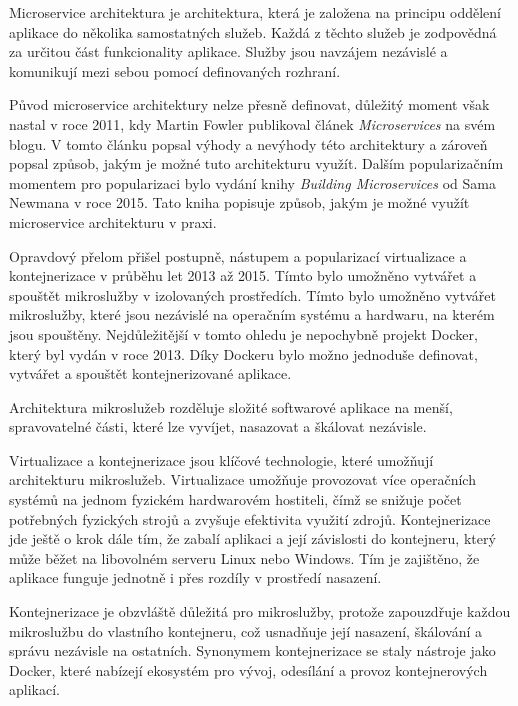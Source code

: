 Microservice architektura je architektura, která je založena na principu oddělení aplikace do několika samostatných služeb. Každá z těchto služeb je zodpovědná za určitou část funkcionality aplikace. Služby jsou navzájem nezávislé a komunikují mezi sebou pomocí definovaných rozhraní. \cite{microservice}

Původ microservice architektury nelze přesně definovat, důležitý moment však nastal v roce 2011, kdy Martin Fowler publikoval článek \textit{Microservices} na svém blogu. V tomto článku popsal výhody a nevýhody této architektury a zároveň popsal způsob, jakým je možné tuto architekturu využít. \cite{fowler} Dalším popularizačním momentem pro popularizaci bylo vydání knihy \textit{Building Microservices} od Sama Newmana v roce 2015. Tato kniha popisuje způsob, jakým je možné využít microservice architekturu v praxi. \cite{newman}

Opravdový přelom přišel postupně, nástupem a popularizací virtualizace a kontejnerizace v průběhu let 2013 až 2015. Tímto bylo umožněno vytvářet a spouštět mikroslužby v izolovaných prostředích. Tímto bylo umožněno vytvářet mikroslužby, které jsou nezávislé na operačním systému a hardwaru, na kterém jsou spouštěny. Nejdůležitější v tomto ohledu je nepochybně projekt Docker, který byl vydán v roce 2013. Díky Dockeru bylo možno jednoduše definovat, vytvářet a spouštět kontejnerizované aplikace. \cite{docker}


Architektura mikroslužeb rozděluje složité softwarové aplikace na menší, spravovatelné části, které lze vyvíjet, nasazovat a škálovat nezávisle.


Virtualizace a kontejnerizace jsou klíčové technologie, které umožňují architekturu mikroslužeb. Virtualizace umožňuje provozovat více operačních systémů na jednom fyzickém hardwarovém hostiteli, čímž se snižuje počet potřebných fyzických strojů a zvyšuje efektivita využití zdrojů. Kontejnerizace jde ještě o krok dále tím, že zabalí aplikaci a její závislosti do kontejneru, který může běžet na libovolném serveru Linux nebo Windows. Tím je zajištěno, že aplikace funguje jednotně i přes rozdíly v prostředí nasazení.

Kontejnerizace je obzvláště důležitá pro mikroslužby, protože zapouzdřuje každou mikroslužbu do vlastního kontejneru, což usnadňuje její nasazení, škálování a správu nezávisle na ostatních. Synonymem kontejnerizace se staly nástroje jako Docker, které nabízejí ekosystém pro vývoj, odesílání a provoz kontejnerových aplikací.

